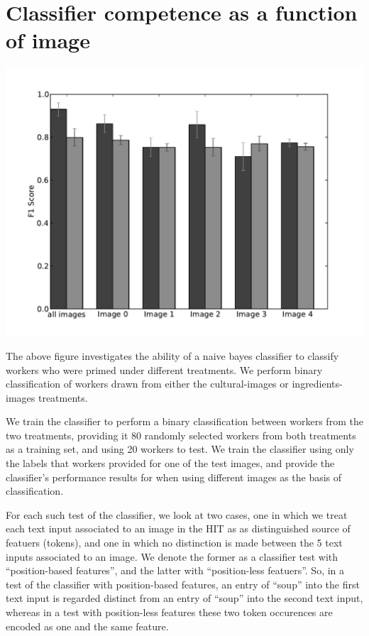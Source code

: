 \documentclass[letterpaper]{article}
\title{}
\author{}
\begin{document}
\maketitle
\section{Classifier competence as a function of image}

\begin{center}
\includegraphics[scale=0.65]{../figs/longitude_cult-ing-img.pdf}
\end{center}


The above figure investigates the ability of a naive bayes classifier to 
classify workers who were primed under different treatments.   
We perform binary classification of workers drawn 
from either the cultural-images or ingredients-images treatments.

We train the classifier to perform a binary classification between workers 
from the two treatments, providing it 80 randomly selected workers from 
both treatments as a training set, and using 20 workers to test.  We train
the classifier using only the labels that workers provided for one of the
test images, and provide the classifier's performance results for when using
different images as the basis of classification.  

For each such test of the classifier, we look at two cases, one in which we
treat each text input associated to an image in the HIT as as distinguished
source of featuers (tokens), and one in which no distinction is made between
the 5 text inputs associated to an image.  We denote the former as a 
classifier test with ``position-based features'', and the latter with 
``position-less featuers''.  So, in a test of the classifier with 
position-based features, an entry of ``soup'' into the first 
text input is regarded distinct from an entry of  ``soup'' into the second 
text input, whereas in a test with position-less features
these two token occurences are encoded as one and the same feature.
\end{document}
